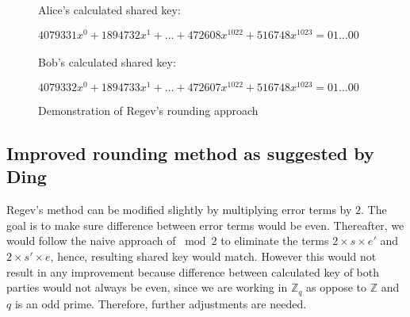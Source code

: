 \begin{figure}[H]
	\begin{center}
	
	Alice's calculated shared key:
	    
	$4079331x^0 + 1894732x^1 + \dots + 472608x^{1022} + 516748x^{1023} = 01 \dots 00$
	\\~\\ 
	Bob's calculated shared key:
	    
	$4079332x^0 + 1894733x^1 + \dots + 472607x^{1022} + 516748x^{1023} = 01 \dots 00$
	\caption{Demonstration of Regev's rounding approach}
    \end{center}
\end{figure}



\subsection{Improved rounding method as suggested by Ding}
Regev's method can be modified slightly by multiplying error terms by $2$. The goal is to make sure difference between error terms would be even. Thereafter, we would follow the naive approach of $\bmod 2$ to eliminate the terms $2 \times s \times e'$ and $2 \times s' \times e$, hence, resulting shared key would match. However this would not result in any improvement because difference between calculated key of both parties would not always be even, since we are working in $\mathbb{Z}_{q}$ as oppose to $\mathbb{Z}$ and $q$ is an odd prime. Therefore, further adjustments are needed.


